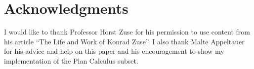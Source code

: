 \documentclass{llncs}
\begin{document}
 \section*{Acknowledgments}
   I would like to thank Professor Horst Zuse for his permission to use content from his article 
   ``The Life and Work of Konrad Zuse''. I also thank Malte Appeltauer for his advice and help 
   on this paper and his encouragement to show my implementation of the Plan Calculus subset.
  
  
  \clearpage
\end{document}
